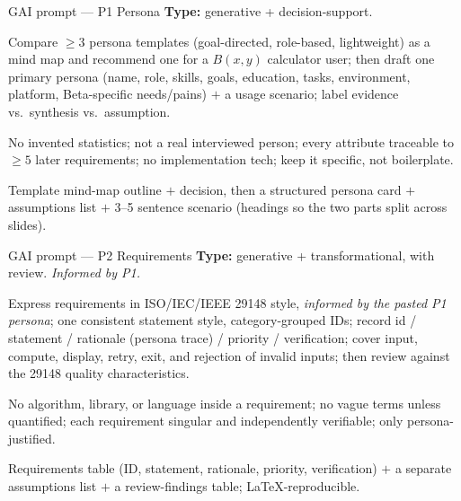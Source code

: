 \documentclass[aspectratio=169]{beamer}
\begin{document}
\begin{frame}{GAI prompt --- P1 Persona}
  \small \textbf{Type:} generative + decision-support.
  \begin{description}\footnotesize
    \item[TASK] Compare $\ge 3$ persona templates (goal-directed, role-based, lightweight)
      as a mind map and recommend one for a $B(x,y)$ calculator user; then draft one
      primary persona (name, role, skills, goals, education, tasks, environment,
      platform, Beta-specific needs/pains) $+$ a usage scenario; label evidence vs.\
      synthesis vs.\ assumption.
    \item[RESTRICTIONS] No invented statistics; not a real interviewed person; every
      attribute traceable to $\ge 5$ later requirements; no implementation tech; keep it
      specific, not boilerplate.
    \item[OUTPUT] Template mind-map outline $+$ decision, then a structured persona card
      $+$ assumptions list $+$ 3--5 sentence scenario (headings so the two parts split
      across slides).
  \end{description}
\end{frame}

\begin{frame}{GAI prompt --- P2 Requirements}
  \small \textbf{Type:} generative + transformational, with review. \emph{Informed by P1.}
  \begin{description}\footnotesize
    \item[TASK] Express requirements in ISO/IEC/IEEE 29148 style, \emph{informed by the
      pasted P1 persona}; one consistent statement style, category-grouped IDs; record
      id / statement / rationale (persona trace) / priority / verification; cover input,
      compute, display, retry, exit, and rejection of invalid inputs; then review against
      the 29148 quality characteristics.
    \item[RESTRICTIONS] No algorithm, library, or language inside a requirement; no vague
      terms unless quantified; each requirement singular and independently verifiable;
      only persona-justified.
    \item[OUTPUT] Requirements table (ID, statement, rationale, priority, verification)
      $+$ a separate assumptions list $+$ a review-findings table; LaTeX-reproducible.
  \end{description}
\end{frame}
\end{document}
